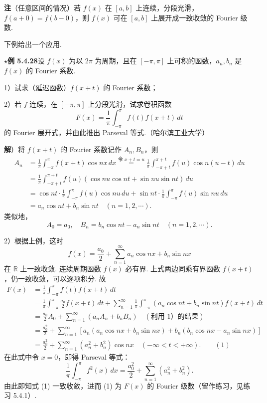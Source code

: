 \documentclass[UTF8, 12pt, fontset=fandol, oneside]{ctexart}
\providecommand{\xlongequal}[1]{\stackrel{#1}{=}}
\begin{document}
\noindent\textbf{注}\quad （任意区间的情况）若 $f(x)$ 在 $[a,b]$ 上连续，分段光滑，$f(a+0)=f(b-0)$，则
$f(x)$ 可在 $[a,b]$ 上展开成一致收敛的 Fourier 级数.

下例给出一个应用.

\noindent\(\star\)\textbf{例 5.4.28}\quad 设 $f(x)$ 为以 $2\pi$ 为周期，且在 $[-\pi,\pi]$ 上可积的函数，$a_n,b_n$ 是
$f(x)$ 的 Fourier 系数.

1）试求（延迟函数）$f(x+t)$ 的 Fourier 系数；

2）若 $f$ 连续，在 $[-\pi,\pi]$ 上分段光滑，试求卷积函数
\[
  F(x)=\frac1\pi\int_{-\pi}^{\pi}f(t)f(x+t)\,dt
\]
的 Fourier 展开式，并由此推出 Parseval 等式.（哈尔滨工业大学）

\noindent\textbf{解}）将 $f(x+t)$ 的 Fourier 系数记作 $A_n,B_n$，则
\[
\begin{aligned}
A_n&=\frac1\pi\int_{-\pi}^{\pi}f(x+t)\cos nx\,dx
\xlongequal{\text{令 }x+t=u}
\frac1\pi\int_{-\pi+t}^{\pi+t}f(u)\cos n(u-t)\,du\\
&=\frac1\pi\int_{-\pi+t}^{\pi+t}f(u)(\cos nu\cos nt+\sin nu\sin nt)\,du\\
&=\cos nt\cdot\frac1\pi\int_{-\pi}^{\pi}f(u)\cos nu\,du
+\sin nt\cdot\frac1\pi\int_{-\pi}^{\pi}f(u)\sin nu\,du\\
&=a_n\cos nt+b_n\sin nt\quad(n=1,2,\cdots).
\end{aligned}
\]
类似地，
\[
  A_0=a_0,\quad B_n=b_n\cos nt-a_n\sin nt\quad(n=1,2,\cdots).
\]

2）根据上例，这时
\[
  f(x)=\frac{a_0}{2}+\sum_{n=1}^{\infty}a_n\cos nx+b_n\sin nx
\]
在 $\mathbb R$ 上一致收敛. 连续周期函数 $f(x)$ 必有界. 上式两边同乘有界函数 $f(x+t)$，仍一致收敛，可以逐项积分. 故
\[
\begin{aligned}
F(x)&=\frac1\pi\int_{-\pi}^{\pi}f(t)f(x+t)\,dt\\
&=\frac1\pi\int_{-\pi}^{\pi}\frac{a_0}{2}f(x+t)\,dt
+\sum_{n=1}^{\infty}\frac1\pi\int_{-\pi}^{\pi}(a_n\cos nt+b_n\sin nt)f(x+t)\,dt\\
&=\frac{a_0}{2}A_0+\sum_{n=1}^{\infty}(a_nA_n+b_nB_n)\quad(\text{利用 1）的结果})\\
&=\frac{a_0^2}{2}+\sum_{n=1}^{\infty}
[a_n(a_n\cos nx+b_n\sin nx)+b_n(b_n\cos nx-a_n\sin nx)]\\
&=\frac{a_0^2}{2}+\sum_{n=1}^{\infty}(a_n^2+b_n^2)\cos nx\quad(-\infty<t<+\infty). \qquad(1)
\end{aligned}
\]
在此式中令 $x=0$，即得 Parseval 等式：
\[
  \frac1\pi\int_{-\pi}^{\pi}f^2(x)\,dx
  =\frac{a_0^2}{2}+\sum_{n=1}^{\infty}(a_n^2+b_n^2).
\]
由此即知式 (1) 一致收敛，进而 (1) 为 $F(x)$ 的 Fourier 级数（留作练习，见练习 5.4.1）.
\end{document}
